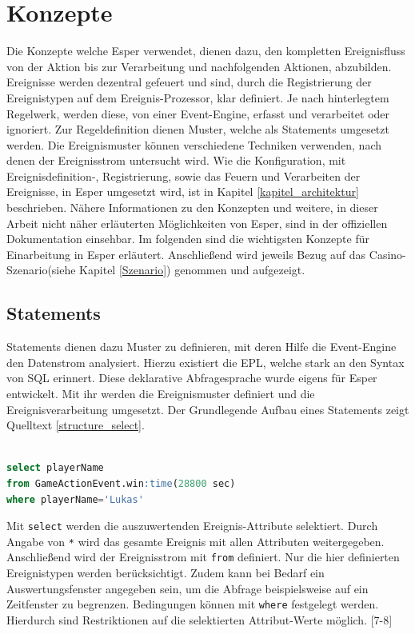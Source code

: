 \chapter{Konzepte}
Die Konzepte welche Esper verwendet, dienen dazu, den kompletten Ereignisfluss von der Aktion bis zur Verarbeitung und nachfolgenden Aktionen, abzubilden.
Ereignisse werden dezentral gefeuert und sind, durch die Registrierung der Ereignistypen auf dem Ereignis-Prozessor, klar definiert. Je nach hinterlegtem Regelwerk, werden diese, von einer Event-Engine, erfasst und verarbeitet oder ignoriert. Zur Regeldefinition dienen Muster, welche als Statements umgesetzt werden. Die Ereignismuster können verschiedene Techniken verwenden, nach denen der Ereignisstrom untersucht wird. 
Wie die Konfiguration, mit Ereignisdefinition-, Registrierung, sowie das Feuern und Verarbeiten der Ereignisse, in Esper umgesetzt wird, ist in Kapitel \ref{kapitel_architektur} beschrieben.
Nähere Informationen zu den Konzepten und weitere, in dieser Arbeit nicht näher erläuterten Möglichkeiten von Esper, sind in der offiziellen Dokumentation \cite{EsperRef2018} einsehbar.
\absatz
Im folgenden sind die wichtigsten Konzepte für Einarbeitung in Esper erläutert. Anschließend wird jeweils Bezug auf das Casino-Szenario(siehe Kapitel \ref{Szenario}) genommen und aufgezeigt.

\section{Statements}
\label{statements}
Statements dienen dazu Muster zu definieren, mit deren Hilfe die Event-Engine den Datenstrom analysiert. Hierzu existiert die \acf{EPL}, welche stark an den Syntax von SQL erinnert. Diese deklarative Abfragesprache wurde eigens für Esper entwickelt. Mit ihr werden die Ereignismuster definiert und die Ereignisverarbeitung umgesetzt. Der Grundlegende Aufbau eines Statements zeigt Quelltext \ref{structure_select}.
\begin{lstlisting}[caption={Beispielhafter Aufbau eines Statements },label=structure_select,captionpos=b,language=SQL]

select playerName 
from GameActionEvent.win:time(28800 sec)
where playerName='Lukas'

\end{lstlisting}
Mit \texttt{select} werden die auszuwertenden Ereignis-Attribute selektiert. Durch Angabe von \texttt{*} wird das gesamte Ereignis mit allen Attributen weitergegeben.
Anschließend wird der Ereignisstrom mit \texttt{from} definiert.
Nur die hier definierten Ereignistypen werden berücksichtigt. Zudem kann bei Bedarf ein Auswertungsfenster angegeben sein, um die Abfrage beispielsweise auf ein Zeitfenster zu begrenzen.
Bedingungen können mit \texttt{where} festgelegt werden. Hierdurch sind Restriktionen auf die selektierten Attribut-Werte möglich.
\cite{EsperRef2018}[7-8]

